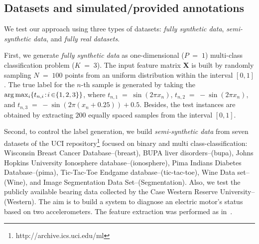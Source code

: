 \documentclass[journal]{IEEEtran}
\providecommand{\mat}[1]{{\bm{#1}}} %
\DeclareMathOperator{\en}{\!\,\in\!\,}
\DeclareMathOperator{\igual}{\!\,=\!\,}
\providecommand{\s}[1]{\negthinspace#1\negthinspace}%
\providecommand{\mat}[1]{{\mathbf{#1}}}
\begin{document}
\subsection{Datasets and simulated/provided annotations}\label{sec:datasets}
We test our approach using three types of datasets:  \textit{fully synthetic data}, \textit{semi-synthetic data}, and \textit{fully real datasets}. 

First, we generate \textit{fully synthetic data} as one-dimensional ($P\igual1$) multi-class classification problem ($K\igual3$). The input feature matrix $\mat{X}$ is built by randomly sampling $N\igual100$ points from an uniform distribution within the interval $[0,1]$. The true label for the $n$-th sample is generated by taking the $\arg \max_i \{t_{n,i}\s{:}i\en\{1,2,3\}\}$, where $t_{n,1}\igual\sin(2\pi{x}_n)$, $t_{n,2}\igual-\sin(2\pi{x}_n)$, and $t_{n,3}\igual-\sin(2\pi({x}_n+0.25))+0.5$. Besides, the test instances are obtained by extracting $200$ equally spaced samples from the interval $[0,1]$.

Second, to control the label generation, we build \textit{semi-synthetic data} from seven datasets of the {UCI repository}\footnote{http://archive.ics.uci.edu/ml} focused on binary and multi class-classification: {Wisconsin Breast Cancer Database}--(breast), {BUPA liver disorders}--(bupa), {Johns Hopkins University Ionosphere database}--(ionosphere), {Pima Indians Diabetes Database}--(pima), {Tic-Tac-Toe Endgame database}--(tic-tac-toe), {Wine Data set}--(Wine), and {Image Segmentation Data Set}--(Segmentation). Also, we test the publicly available bearing data collected by the Case Western Reserve University--(Western). The aim is to build a system to diagnose an electric motor's status based on two accelerometers. The feature extraction was performed as in~\cite{hernandez2020bearing}.
\end{document}
